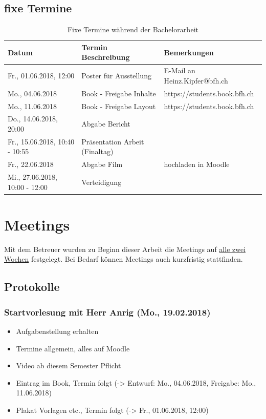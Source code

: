 \subsection{fixe Termine}
\begin{table}[H]
	\centering
	\begin{tabular}{lll} \toprule
		\textbf{Datum} 			& \textbf{Termin Beschreibung}		& \textbf{Bemerkungen}		\\ \midrule
		Fr., 01.06.2018, 12:00		& Poster für Ausstellung 		& E-Mail an Heinz.Kipfer@bfh.ch	\\ \midrule
		Mo., 04.06.2018 		& Book - Freigabe Inhalte		& https://students.book.bfh.ch	\\ \midrule
		Mo., 11.06.2018 		& Book - Freigabe Layout		& https://students.book.bfh.ch	\\ \midrule
		Do., 14.06.2018, 20:00		& Abgabe Bericht			&  				\\ \midrule
		Fr., 15.06.2018, 10:40 - 10:55	& Präsentation Arbeit (Finaltag)	&  				\\ \midrule
		Fr., 22.06.2018			& Abgabe Film				& hochladen in Moodle		\\ \midrule
		Mi., 27.06.2018, 10:00 - 12:00	& Verteidigung				&				\\ \bottomrule
	\end{tabular}
	\caption{Fixe Termine während der Bachelorarbeit}
	\label{tab:fixeTermine}
\end{table}


\section{Meetings}
Mit dem Betreuer wurden zu Beginn dieser Arbeit die Meetings auf \underline{alle zwei Wochen} festgelegt. Bei Bedarf können Meetings auch kurzfristig stattfinden.
\subsection{Protokolle}
\subsubsection{Startvorlesung mit Herr Anrig (Mo., 19.02.2018)}
\begin{itemize}
	\item Aufgabenstellung erhalten
	\item Termine allgemein, alles auf Moodle
	\item Video ab diesem Semester Pflicht
	\item Eintrag im Book, Termin folgt (-> Entwurf: Mo., 04.06.2018, Freigabe: Mo., 11.06.2018)
	\item Plakat Vorlagen etc., Termin folgt (-> Fr., 01.06.2018, 12:00)
\end{itemize}

